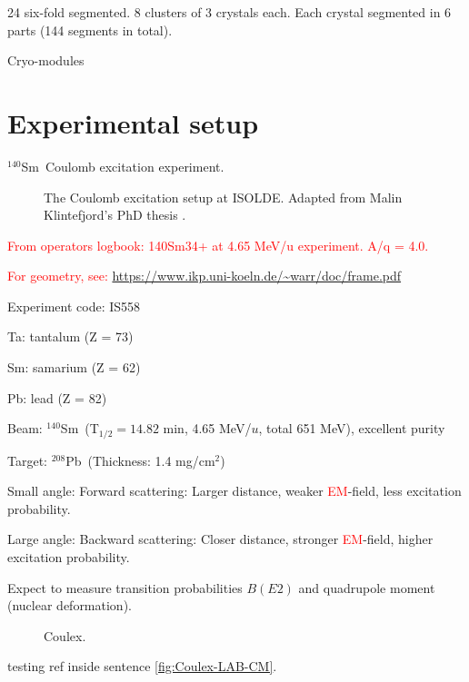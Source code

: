 \documentclass[twoside,english]{uiofysmaster/uiofysmaster}
\newcommand{\Sm}{$^{140}$Sm} %
\newcommand{\Pb}{$^{208}$Pb}
\let\orgautoref\autoref
\renewcommand{\autoref}
        {\def\equationautorefname{Eq.}%
         \def\figureautorefname{Fig.}%
         \def\subfigureautorefname{Fig.}%
         \def\sectionautorefname{Sec.}%
         \def\subsectionautorefname{Sec.}%
         \def\subsubsectionautorefname{Sec.}%
         \def\Itemautorefname{item}%
         \def\tableautorefname{Tab.}%
         \orgautoref}
\begin{document}
24 six-fold segmented. 8 clusters of 3 crystals each. Each crystal segmented in 6 parts (144 segments in total).

\bigskip

Cryo-modules

\section{Experimental setup}
\Sm ~Coulomb excitation experiment.


\begin{figure}[ht]
	\centering
	
	\caption{The Coulomb excitation setup at ISOLDE. Adapted from Malin Klintefjord's PhD thesis \cite{Klintefjord}.}
	\label{fig:Coulex}
\end{figure}

\textcolor{red}{From operators logbook: 140Sm34+ at 4.65 MeV/u experiment. A/q = 4.0.}

\begin{table}[ht] 
	\centering 
	
\end{table}
\textcolor{red}{For geometry, see: \url{https://www.ikp.uni-koeln.de/~warr/doc/frame.pdf}}






\bigskip

Experiment code: IS558 

Ta: tantalum (Z = 73)

Sm: samarium (Z = 62)

Pb: lead (Z = 82) \newline



Beam: \Sm ~(T$_{1/2} = 14.82$ min, 4.65 MeV/$u$, total 651 MeV), excellent purity

Target: \Pb ~(Thickness: 1.4 mg/cm$^2$)


Small angle: Forward scattering: Larger distance, weaker \textcolor{red}{EM}-field, less excitation probability.

Large angle: Backward scattering: Closer distance, stronger \textcolor{red}{EM}-field, higher excitation probability. \newline


\bigskip

Expect to measure transition probabilities $B(E2)$ and quadrupole moment (nuclear deformation). 

\bigskip

\begin{figure}[ht]
	\centering
	
	\caption{Coulex.}
	\label{fig:Coulex-LAB-CM}
\end{figure}
testing ref inside sentence \autoref{fig:Coulex-LAB-CM}.
\end{document}

